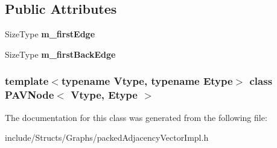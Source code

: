 \subsection*{Public Attributes}
\begin{DoxyCompactItemize}
\item 
\hypertarget{class_p_a_v_node_ae56030993ecce99261fc0cbac2130453}{
SizeType {\bfseries m\_\-firstEdge}}
\label{class_p_a_v_node_ae56030993ecce99261fc0cbac2130453}

\item 
\hypertarget{class_p_a_v_node_a42fcb54c20a4b1f1ada857719806edc8}{
SizeType {\bfseries m\_\-firstBackEdge}}
\label{class_p_a_v_node_a42fcb54c20a4b1f1ada857719806edc8}

\end{DoxyCompactItemize}
\subsubsection*{template$<$typename Vtype, typename Etype$>$ class PAVNode$<$ Vtype, Etype $>$}



The documentation for this class was generated from the following file:\begin{DoxyCompactItemize}
\item 
include/Structs/Graphs/packedAdjacencyVectorImpl.h\end{DoxyCompactItemize}
